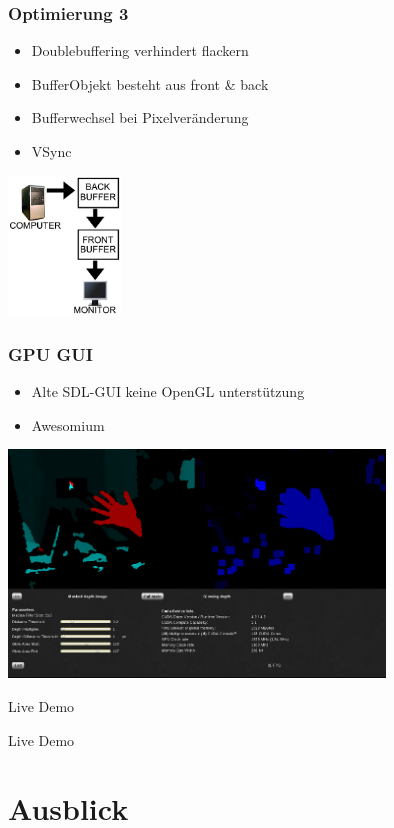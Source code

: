 \documentclass[compress]{beamer}
\begin{document}
\begin{frame}
\frametitle{Optimierung 3}
\begin{itemize}
\item Doublebuffering verhindert flackern
\item BufferObjekt besteht aus front \& back
\item Bufferwechsel bei Pixelveränderung
\item VSync
\end{itemize}
\hspace*{4cm}\includegraphics[width=3cm]{double.png}
\end{frame}

\begin{frame}
\frametitle{GPU GUI}
\begin{itemize}
\item Alte SDL-GUI keine OpenGL unterstützung
\item Awesomium
\end{itemize}
\hspace*{1,2cm}\includegraphics[width=10cm]{gui.png}
\end{frame}

\begin{frame}{Live Demo}
\Huge
\centerline{Live Demo}
\end{frame}

\section{Ausblick}
\end{document}
